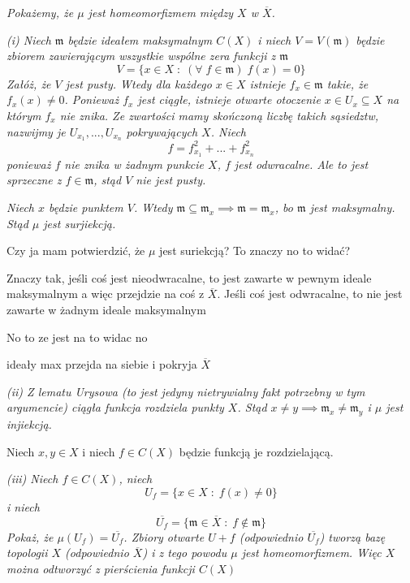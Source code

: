 \documentclass{article}
\begin{document}
\emph{\color{pink}Pokażemy, że $\mu$ jest homeomorfizmem między $X$ w $\overline X$.}

{\color{yellow}\emph{(i) Niech $\mathfrak{m}$ będzie ideałem maksymalnym $C(X)$ i niech $V =V(\mathfrak{m})$ będzie zbiorem zawierającym wszystkie wspólne zera funkcji z $\mathfrak{m}$}
$$V=\{x\in X\;:\;(\forall\;f\in\mathfrak{m})\;f(x)=0\}$$
\emph{Załóż, że $V$ jest pusty. Wtedy dla każdego $x\in X$ istnieje $f_x\in\mathfrak{m}$ takie, że $f_x(x)\neq 0$. Ponieważ $f_x$ jest ciągłe, istnieje otwarte otoczenie $x\in U_x\subseteq X$ na którym $f_x$ nie znika. Ze zwartości mamy skończoną liczbę takich sąsiedztw, nazwijmy je $U_{x_1},...,U_{x_n}$ pokrywających $X$. Niech}
$$f=f_{x_1}^2+...+f_{x_n}^2$$
\emph{ponieważ $f$ nie znika w żadnym punkcie $X$, $f$ jest odwracalne. Ale to jest sprzeczne z $f\in\mathfrak{m}$, stąd $V$ nie jest pusty.}

\emph{Niech $x$ będzie punktem $V$. Wtedy $\mathfrak{m}\subseteq\mathfrak{m}_x\implies \mathfrak{m}=\mathfrak{m}_x$, bo $\mathfrak{m}$ jest maksymalny. Stąd $\mu$ jest surjiekcją.}}

Czy ja mam potwierdzić, że $\mu$ jest suriekcją? To znaczy no to widać?

Znaczy tak, jeśli coś jest nieodwracalne, to jest zawarte w pewnym ideale maksymalnym a więc przejdzie na coś z $\overline X$. Jeśli coś jest odwracalne, to nie jest zawarte w żadnym ideale maksymalnym

No to ze jest na to widac no

ideały max przejda na siebie i pokryja $\overline X$

\emph{\color{yellow}(ii) Z lematu Urysowa (to jest jedyny nietrywialny fakt potrzebny w tym argumencie) ciągła funkcja rozdziela punkty $X$. Stąd $x\neq y\implies\mathfrak{m}_x\neq\mathfrak{m}_y$ i $\mu$ jest injiekcją.}

Niech $x, y\in X$ i niech $f\in C(X)$ będzie funkcją je rozdzielającą.

\emph{\color{yellow}(iii) Niech $f\in C(X)$, niech}
$$U_f=\{x\in X\;:\;f(x)\neq 0\}$$
\emph{\color{yellow}i niech}
$$\overline{U_f}=\{\mathfrak{m}\in\overline X\;:\;f\notin \mathfrak{m}\}$$
\emph{\color{yellow}Pokaż, że $\mu(U_f)=\overline{U_f}$. Zbiory otwarte $U+f$ (odpowiednio $\overline{U_f}$) tworzą bazę topologii $X$ (odpowiednio $\overline X$) i z tego powodu $\mu$ jest homeomorfizmem. Więc $X$ można odtworzyć z pierścienia funkcji $C(X)$}
\end{document}
